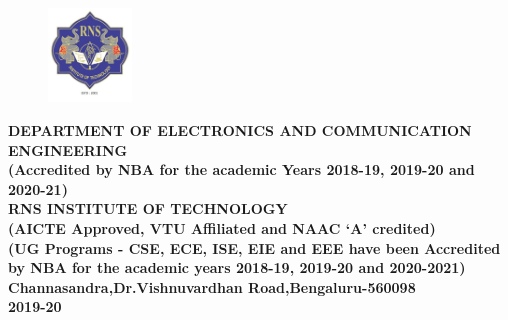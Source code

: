 \begin{titlingpage}
\begin{figure}[h]
	\centering
	\includegraphics[height=2.5cm]{images/rns1.jpg}
\end{figure}

\begin{center}
\scriptsize\textbf{DEPARTMENT OF ELECTRONICS AND COMMUNICATION ENGINEERING}\\
\small\textbf{(Accredited by NBA for the academic Years 2018-19, 2019-20 and 2020-21)
\\
\vspace{0.5cm}
RNS INSTITUTE OF TECHNOLOGY\\
(AICTE Approved, VTU Affiliated and NAAC `A' credited)\\
(UG Programs - CSE, ECE, ISE, EIE and EEE have been Accredited by NBA for the academic years 2018-19, 2019-20 and 2020-2021)\\
Channasandra,Dr.Vishnuvardhan Road,Bengaluru-560098\\
	 2019-20
}

\end{center}
\end{titlingpage}

